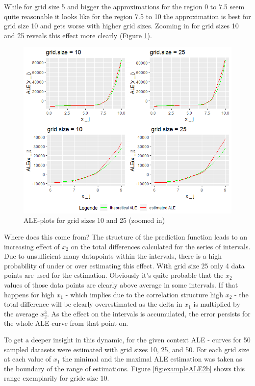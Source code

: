 \documentclass[
]{krantz}
\begin{document}
While for grid size 5 and bigger the approximations for the region 0 to 7.5 seem quite reasonable it looks like for the region 7.5 to 10 the approximation is best for grid size 10 and gets worse with higher grid sizes. Zooming in for grid sizes 10 and 25 reveals this effect more clearly (Figure \ref{fig:exampleALE2a}).

\begin{figure}
\includegraphics[width=1\linewidth]{images/ALE_2_example2_zoom_} \caption{ALE-plots for grid sizes 10 and 25 (zoomed in)}\label{fig:exampleALE2a}
\end{figure}



Where does this come from? The structure of the prediction function leads to an increasing effect of \(x_2\) on the total differences calculated for the series of intervals. Due to unsufficient many datapoints within the intervals, there is a high probability of under or over estimating this effect. With grid size 25 only 4 data points are used for the estimation. Obviously it's quite probable that the \(x_2\) values of those data points are clearly above average in some intervals. If that happens for high \(x_1\) - which implies due to the correlation structure high \(x_2\) - the total difference will be clearly overestimated as the delta in \(x_1\) is multiplied by the average \(x_2^3\). As the effect on the intervals is accumulated, the error persists for the whole ALE-curve from that point on.

To get a deeper insight in this dynamic, for the given context ALE - curves for 50 sampled datasets were estimated with grid sizes 10, 25, and 50. For each grid size at each value of \(x_1\) the minimal and the maximal ALE estimation was taken as the boundary of the range of estimations. Figure \ref{fig:exampleALE2b} shows this range exemplarily for gride size 10.
\end{document}
